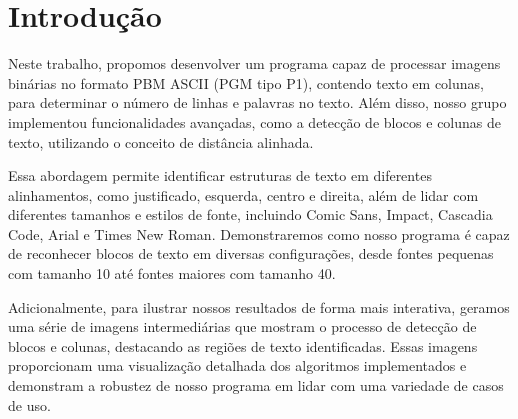 \documentclass[english, 
               brazil, 
               bsc] %
               {dcomp-abntex2}
\begin{document}


\frenchspacing 




\pretextual




\orientador{}
\coorientador{}







%
%
\imprimircapa
%  
%     
\mostrarSUMARIO




\textual


\chapter{Introdução} \label{introduction}

Neste trabalho, propomos desenvolver um programa capaz de processar imagens binárias no formato PBM ASCII (PGM tipo P1), contendo texto em colunas, para determinar o número de linhas e palavras no texto. Além disso, nosso grupo implementou funcionalidades avançadas, como a detecção de blocos e colunas de texto, utilizando o conceito de distância alinhada.

Essa abordagem permite identificar estruturas de texto em diferentes alinhamentos, como justificado, esquerda, centro e direita, além de lidar com diferentes tamanhos e estilos de fonte, incluindo Comic Sans, Impact, Cascadia Code, Arial e Times New Roman. Demonstraremos como nosso programa é capaz de reconhecer blocos de texto em diversas configurações, desde fontes pequenas com tamanho 10 até fontes maiores com tamanho 40.

Adicionalmente, para ilustrar nossos resultados de forma mais interativa, geramos uma série de imagens intermediárias que mostram o processo de detecção de blocos e colunas, destacando as regiões de texto identificadas. Essas imagens proporcionam uma visualização detalhada dos algoritmos implementados e demonstram a robustez de nosso programa em lidar com uma variedade de casos de uso.
\end{document}
